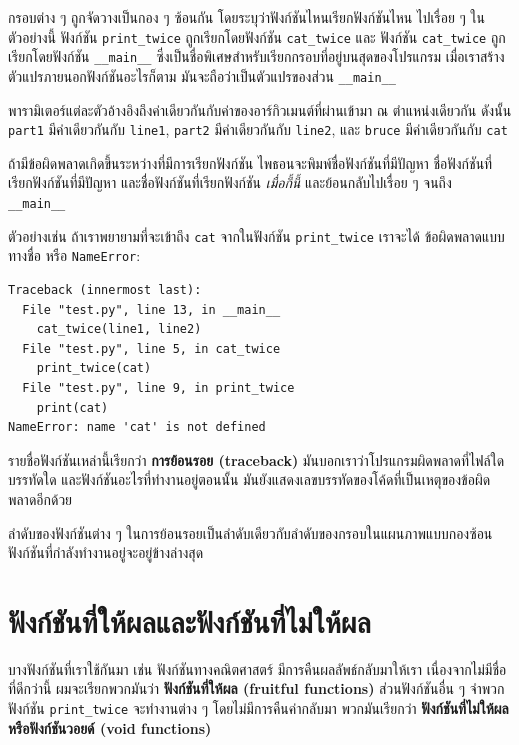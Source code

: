 กรอบต่าง ๆ ถูกจัดวางเป็นกอง ๆ ซ้อนกัน โดยระบุว่าฟังก์ชันไหนเรียกฟังก์ชันไหน ไปเรื่อย ๆ
ในตัวอย่างนี้ ฟังก์ชัน \verb|print_twice| ถูกเรียกโดยฟังก์ชัน \verb|cat_twice| และ
ฟังก์ชัน \verb|cat_twice| ถูกเรียกโดยฟังก์ชัน \verb|__main__| ซึ่งเป็นชื่อพิเศษสำหรับเรียกกรอบที่อยู่บนสุดของโปรแกรม เมื่อเราสร้างตัวแปรภายนอกฟังก์ชันอะไรก็ตาม มันจะถือว่าเป็นตัวแปรของส่วน \verb"__main__"

พารามิเตอร์แต่ละตัวอ้างอิงถึงค่าเดียวกันกับค่าของอาร์กิวเมนต์ที่ผ่านเข้ามา ณ ตำแหน่งเดียวกัน
ดังนั้น {\tt part1} มีค่าเดียวกันกับ {\tt line1}, {\tt part2} มีค่าเดียวกันกับ {\tt line2},
และ {\tt bruce} มีค่าเดียวกันกับ {\tt cat}

ถ้ามีข้อผิดพลาดเกิดขึ้นระหว่างที่มีการเรียกฟังก์ชัน ไพธอนจะพิมพ์ชื่อฟังก์ชันที่มีปัญหา ชื่อฟังก์ชันที่เรียกฟังก์ชันที่มีปัญหา 
และชื่อฟังก์ชันที่เรียกฟังก์ชัน {\em เมื่อกี้นี้} และย้อนกลับไปเรื่อย ๆ จนถึง \verb"__main__"

ตัวอย่างเช่น ถ้าเราพยายามที่จะเข้าถึง {\tt cat} จากในฟังก์ชัน \verb|print_twice| เราจะได้
ข้อผิดพลาดแบบทางชื่อ หรือ {\tt NameError}:

\begin{verbatim}
Traceback (innermost last):
  File "test.py", line 13, in __main__
    cat_twice(line1, line2)
  File "test.py", line 5, in cat_twice
    print_twice(cat)
  File "test.py", line 9, in print_twice
    print(cat)
NameError: name 'cat' is not defined
\end{verbatim}
%
รายชื่อฟังก์ชันเหล่านี้เรียกว่า {\bf การย้อนรอย (traceback)} มันบอกเราว่าโปรแกรมผิดพลาดที่ไฟล์ใด
บรรทัดใด และฟังก์ชันอะไรที่ทำงานอยู่ตอนนั้น  มันยังแสดงเลขบรรทัดของโค้ดที่เป็นเหตุของข้อผิดพลาดอีกด้วย

ลำดับของฟังก์ชันต่าง ๆ ในการย้อนรอยเป็นลำดับเดียวกับลำดับของกรอบในแผนภาพแบบกองซ้อน
ฟังก์ชันที่กำลังทำงานอยู่จะอยู่ข้างล่างสุด 


\section{ฟังก์ชันที่ให้ผลและฟังก์ชันที่ไม่ให้ผล} %

บางฟังก์ชันที่เราใช้กันมา เช่น ฟังก์ชันทางคณิตศาสตร์ มีการคืนผลลัพธ์กลับมาให้เรา  เนื่องจากไม่มีชื่อที่ดีกว่านี้
ผมจะเรียกพวกมันว่า {\bf ฟังก์ชันที่ให้ผล (fruitful functions)}  ส่วนฟังก์ชันอื่น ๆ จำพวกฟังก์ชัน 
\verb|print_twice| จะทำงานต่าง ๆ โดยไม่มีการคืนค่ากลับมา พวกมันเรียกว่า 
{\bf ฟังก์ชันที่ไม่ให้ผล หรือฟังก์ชันวอยด์ (void functions)} 

